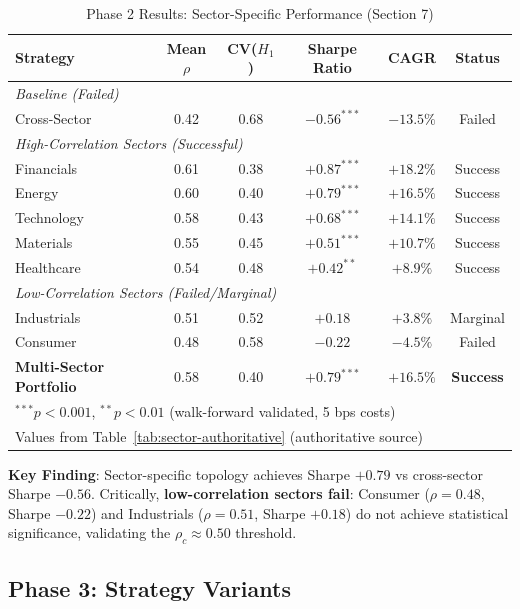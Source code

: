 \documentclass[12pt,letterpaper]{article}
\begin{document}
\begin{table}[H]
\centering
\caption{Phase 2 Results: Sector-Specific Performance (Section 7)}
\label{tab:phase2}
\begin{tabular}{@{}lccccc@{}}
\toprule
\textbf{Strategy} & \textbf{Mean $\rho$} & \textbf{CV($H_1$)} & \textbf{Sharpe Ratio} & \textbf{CAGR} & \textbf{Status} \\
\midrule
\multicolumn{6}{l}{\textit{Baseline (Failed)}} \\
Cross-Sector & 0.42 & 0.68 & $-0.56^{***}$ & $-13.5\%$ & Failed \\
\midrule
\multicolumn{6}{l}{\textit{High-Correlation Sectors (Successful)}} \\
Financials & 0.61 & 0.38 & $+0.87^{***}$ & $+18.2\%$ & Success \\
Energy & 0.60 & 0.40 & $+0.79^{***}$ & $+16.5\%$ & Success \\
Technology & 0.58 & 0.43 & $+0.68^{***}$ & $+14.1\%$ & Success \\
Materials & 0.55 & 0.45 & $+0.51^{***}$ & $+10.7\%$ & Success \\
Healthcare & 0.54 & 0.48 & $+0.42^{**}$ & $+8.9\%$ & Success \\
\midrule
\multicolumn{6}{l}{\textit{Low-Correlation Sectors (Failed/Marginal)}} \\
Industrials & 0.51 & 0.52 & $+0.18$ & $+3.8\%$ & Marginal \\
Consumer & 0.48 & 0.58 & $-0.22$ & $-4.5\%$ & Failed \\
\midrule
\textbf{Multi-Sector Portfolio} & 0.58 & 0.40 & \textbf{$+0.79^{***}$} & \textbf{$+16.5\%$} & \textbf{Success} \\
\bottomrule
\multicolumn{6}{l}{\footnotesize $^{***}p < 0.001$, $^{**}p < 0.01$ (walk-forward validated, 5 bps costs)} \\
\multicolumn{6}{l}{\footnotesize Values from Table~\ref{tab:sector-authoritative} (authoritative source)}
\end{tabular}
\end{table}

\textbf{Key Finding}: Sector-specific topology achieves Sharpe $+0.79$ vs cross-sector Sharpe $-0.56$. Critically, \textbf{low-correlation sectors fail}: Consumer ($\rho = 0.48$, Sharpe $-0.22$) and Industrials ($\rho = 0.51$, Sharpe $+0.18$) do not achieve statistical significance, validating the $\rho_c \approx 0.50$ threshold.

\subsection{Phase 3: Strategy Variants}
\end{document}
